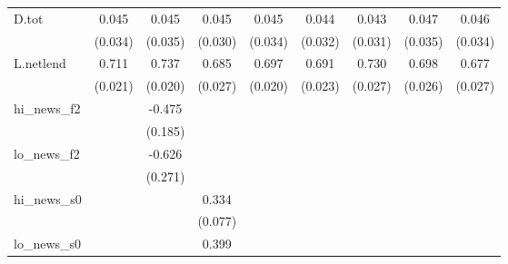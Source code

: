 {\begin{tabular}{l*{8}{c}}
D.tot       &       0.045         &       0.045         &       0.045         &       0.045         &       0.044         &       0.043         &       0.047         &       0.046         \\
            &     (0.034)         &     (0.035)         &     (0.030)         &     (0.034)         &     (0.032)         &     (0.031)         &     (0.035)         &     (0.034)         \\
\addlinespace
L.netlend   &       0.711\sym{***}&       0.737\sym{***}&       0.685\sym{***}&       0.697\sym{***}&       0.691\sym{***}&       0.730\sym{***}&       0.698\sym{***}&       0.677\sym{***}\\
            &     (0.021)         &     (0.020)         &     (0.027)         &     (0.020)         &     (0.023)         &     (0.027)         &     (0.026)         &     (0.027)         \\
\addlinespace
hi\_news\_f2  &                     &      -0.475\sym{**} &                     &                     &                     &                     &                     &                     \\
            &                     &     (0.185)         &                     &                     &                     &                     &                     &                     \\
\addlinespace
lo\_news\_f2  &                     &      -0.626\sym{**} &                     &                     &                     &                     &                     &                     \\
            &                     &     (0.271)         &                     &                     &                     &                     &                     &                     \\
\addlinespace
hi\_news\_s0  &                     &                     &       0.334\sym{***}&                     &                     &                     &                     &                     \\
            &                     &                     &     (0.077)         &                     &                     &                     &                     &                     \\
\addlinespace
lo\_news\_s0  &                     &                     &       0.399\sym{***}&                     &                     &                     &                     &                     \\

\end{tabular}}
